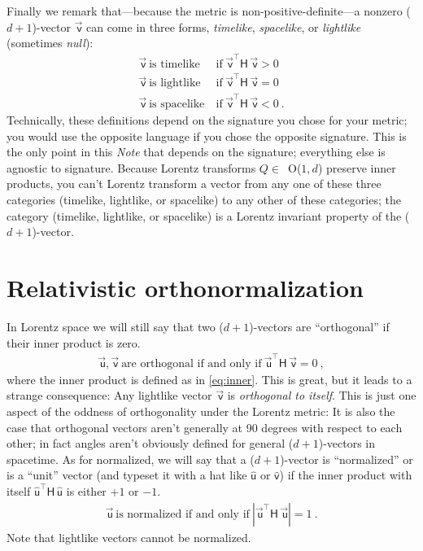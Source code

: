 \documentclass{article}
\newcommand{\metric}{\mathsf{H}}
\newcommand\upvec[1]{\!\vec{\,\mathrm{#1}}}
\newcommand{\Lvec}[1]{\upvec{\mathsf{#1}}} %
\newcommand{\Lhat}[1]{\hat{\mathsf{#1}}} %
\newcommand{\plus}{\!+\!} %
\newcommand{\documentname}{\textsl{Note}}
\begin{document}
Finally we remark that---because the metric is non-positive-definite---a nonzero ($d\plus1$)-vector $\Lvec{v}$ can come in three forms, \emph{timelike}, \emph{spacelike}, or \emph{lightlike} (sometimes \emph{null}):
\begin{align}
    \Lvec{v} ~ \mbox{is timelike}  &~ \mbox{if} ~ \Lvec{v}^\top\metric\,\Lvec{v} > 0 \label{eq:timelike}\\
    \Lvec{v} ~ \mbox{is lightlike} &~ \mbox{if} ~ \Lvec{v}^\top\metric\,\Lvec{v} = 0 \label{eq:lightlike}\\
    \Lvec{v} ~ \mbox{is spacelike} &~ \mbox{if} ~ \Lvec{v}^\top\metric\,\Lvec{v} < 0 ~.\label{eq:spacelike}
\end{align}
Technically, these definitions depend on the signature you chose for your metric; you would use the opposite language if you chose the opposite signature.
This is the only point in this \documentname{} that depends on the signature; everything else is agnostic to signature.
Because Lorentz transforms $Q\in$~O($1,d$) preserve inner products, you can't Lorentz transform a vector from any one of these three categories (timelike, lightlike, or spacelike) to any other of these categories; the category (timelike, lightlike, or spacelike) is a Lorentz invariant property of the ($d\plus1$)-vector.

\section{Relativistic orthonormalization}\label{sec:orth}

In Lorentz space we will still say that two ($d\plus1$)-vectors are ``orthogonal'' if their inner product is zero.
\begin{align}
    \Lvec{u},\Lvec{v} ~ \mbox{are orthogonal if and only if} ~ \Lvec{u}^\top\metric\,\Lvec{v}=0 ~,
\end{align}
where the inner product is defined as in \eqref{eq:inner}.
This is great, but it leads to a strange consequence:
Any lightlike vector $\Lvec{v}$ is \emph{orthogonal to itself}.
This is just one aspect of the oddness of orthogonality under the Lorentz metric:
It is also the case that orthogonal vectors aren't generally at 90 degrees with respect to each other; in fact angles aren't obviously defined for general ($d\plus1$)-vectors in spacetime.
As for normalized, we will say that a ($d\plus1$)-vector is ``normalized'' or is a ``unit'' vector (and typeset it with a hat like $\Lhat{u}$ or $\Lhat{v}$) if the inner product with itself $\Lhat{u}^\top\metric\,\Lhat{u}$ is either $+1$ or $-1$.
\begin{align}
    \Lvec{u} ~ \mbox{is normalized if and only if} ~ |\Lvec{u}^\top\metric\,\Lvec{u}| = 1 ~.
\end{align}
Note that lightlike vectors cannot be normalized.
\end{document}
